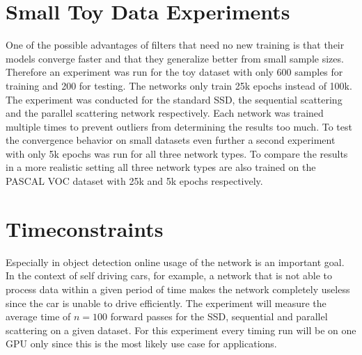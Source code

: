 \section{Small Toy Data Experiments}

One of the possible advantages of filters that need no new training is that their models converge faster and that they generalize better from small sample sizes. Therefore an experiment was run for the toy dataset with only 600 samples for training and 200 for testing. The networks only train 25k epochs instead of 100k. The experiment was conducted for the standard SSD, the sequential scattering and the parallel scattering network respectively. Each network was trained multiple times to prevent outliers from determining the results too much. To test the convergence behavior on small datasets even further a second experiment with only 5k epochs was run for all three network types. To compare the results in a more realistic setting all three network types are also trained on the PASCAL VOC dataset with 25k and 5k epochs respectively. 


\section{Timeconstraints}

Especially in object detection online usage of the network is an important goal. In the context of self driving cars, for example, a network that is not able to process data within a given period of time makes the network completely useless since the car is unable to drive efficiently. The experiment will measure the average time of $n=100$ forward passes for the SSD, sequential and parallel scattering on a given dataset. For this experiment every timing run will be on one GPU only since this is the most likely use case for applications. 
